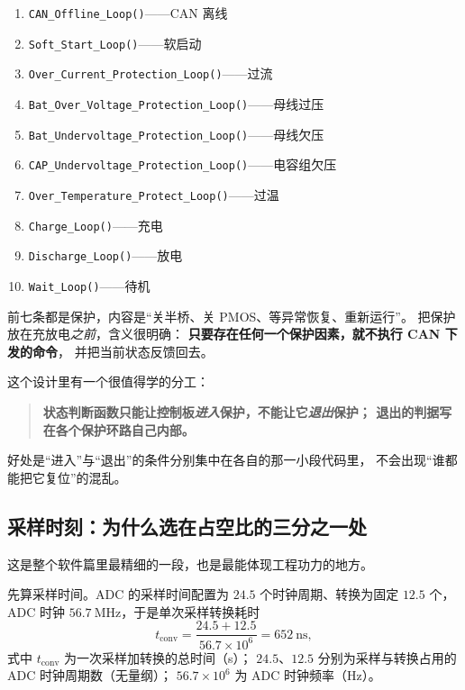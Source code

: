 \documentclass[cn,blue,11pt,device=normal]{elegantnote}
\begin{document}
\begin{enumerate}
  \item \texttt{CAN\_\allowbreak{}Offline\_\allowbreak{}Loop()}——CAN 离线
  \item \texttt{Soft\_\allowbreak{}Start\_\allowbreak{}Loop()}——软启动
  \item \texttt{Over\_\allowbreak{}Current\_\allowbreak{}Protection\_\allowbreak{}Loop()}——过流
  \item \texttt{Bat\_\allowbreak{}Over\_\allowbreak{}Voltage\_\allowbreak{}Protection\_\allowbreak{}Loop()}——母线过压
  \item \texttt{Bat\_\allowbreak{}Undervoltage\_\allowbreak{}Protection\_\allowbreak{}Loop()}——母线欠压
  \item \texttt{CAP\_\allowbreak{}Undervoltage\_\allowbreak{}Protection\_\allowbreak{}Loop()}——电容组欠压
  \item \texttt{Over\_\allowbreak{}Temperature\_\allowbreak{}Protect\_\allowbreak{}Loop()}——过温
  \item \texttt{Charge\_\allowbreak{}Loop()}——充电
  \item \texttt{Discharge\_\allowbreak{}Loop()}——放电
  \item \texttt{Wait\_\allowbreak{}Loop()}——待机
\end{enumerate}

前七条都是保护，内容是“关半桥、关 PMOS、等异常恢复、重新运行”。
把保护放在充放电\emph{之前}，含义很明确：
\textbf{只要存在任何一个保护因素，就不执行 CAN 下发的命令}，
并把当前状态反馈回去。

这个设计里有一个很值得学的分工：

\begin{quote}
\textbf{状态判断函数只能让控制板\emph{进入}保护，不能让它\emph{退出}保护；
退出的判据写在各个保护环路自己内部。}
\end{quote}

好处是“进入”与“退出”的条件分别集中在各自的那一小段代码里，
不会出现“谁都能把它复位”的混乱。

\subsection{采样时刻：为什么选在占空比的三分之一处}

这是整个软件篇里最精细的一段，也是最能体现工程功力的地方。

先算采样时间。ADC 的采样时间配置为 $24.5$ 个时钟周期、转换为固定 $12.5$ 个，
ADC 时钟 $56.7\ \mathrm{MHz}$，于是单次采样转换耗时
\begin{equation}\label{eq:adctime}
  t_{\mathrm{conv}} = \frac{24.5+12.5}{56.7\times10^{6}} = 652\ \mathrm{ns},
\end{equation}
式中 $t_{\mathrm{conv}}$ 为一次采样加转换的总时间（s）；
$24.5$、$12.5$ 分别为采样与转换占用的 ADC 时钟周期数（无量纲）；
$56.7\times10^{6}$ 为 ADC 时钟频率（Hz）。
\end{document}
